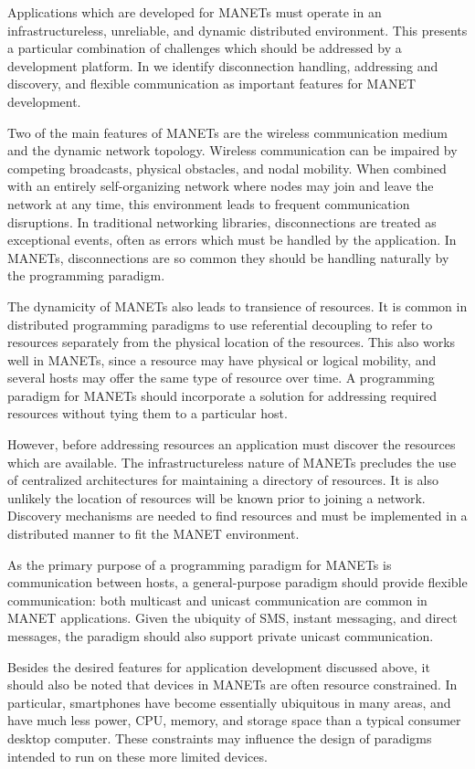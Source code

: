 \documentclass[lnicst]{svmultln}
\begin{document}
Applications which are developed for MANETs must operate in an infrastructureless, unreliable, and dynamic distributed environment. This presents a particular combination of challenges which should be addressed by a development platform. In \cite{mine} we identify disconnection handling, addressing and discovery, and flexible communication as important features for MANET development.

Two of the main features of MANETs are the wireless communication medium and the dynamic network topology. Wireless communication can be impaired by competing broadcasts, physical obstacles, and nodal mobility. When combined with an entirely self-organizing network where nodes may join and leave the network at any time, this environment leads to frequent communication disruptions. In traditional networking libraries, disconnections are treated as exceptional events, often as errors which must be handled by the application. In MANETs, disconnections are so common they should be handling naturally by the programming paradigm.

The dynamicity of MANETs also leads to transience of resources. It is common in distributed programming paradigms to use referential decoupling to refer to resources separately from the physical location of the resources. This also works well in MANETs, since a resource may have physical or logical mobility, and several hosts may offer the same type of resource over time. A programming paradigm for MANETs should incorporate a solution for addressing required resources without tying them to a particular host.

However, before addressing resources an application must discover the resources which are available. The infrastructureless nature of MANETs precludes the use of centralized architectures for maintaining a directory of resources. It is also unlikely the location of resources will be known prior to joining a network. Discovery mechanisms are needed to find resources and must be implemented in a distributed manner to fit the MANET environment.

As the primary purpose of a programming paradigm for MANETs is communication between hosts, a general-purpose paradigm should provide flexible communication: both multicast and unicast communication are common in MANET applications. Given the ubiquity of SMS, instant messaging, and direct messages, the paradigm should also support private unicast communication.

Besides the desired features for application development discussed above, it should also be noted that devices in MANETs are often resource constrained. In particular, smartphones have become essentially ubiquitous in many areas, and have much less power, CPU, memory, and storage space than a typical consumer desktop computer. These constraints may influence the design of paradigms intended to run on these more limited devices.
\end{document}
